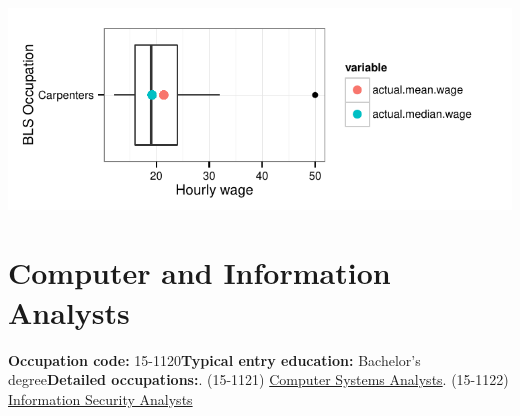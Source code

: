 \documentclass[a4paper,10pt]{article}\usepackage[]{graphicx}\usepackage[]{color}
\makeatletter
\def\maxwidth{ %
  \ifdim\Gin@nat@width>\linewidth
    \linewidth
  \else
    \Gin@nat@width
  \fi
}
\makeatother
\begin{document}
{\centering \includegraphics[width=\maxwidth]{figure/unnamed-chunk-256} 

}


\newpage\section{Computer and Information Analysts}\textbf{Occupation code:} 15-1120\newline\textbf{Typical entry education:} Bachelor's degree\newline\textbf{Detailed occupations:}. (15-1121)  \href{http://www.bls.gov/oes/current/oes151121.htm}{Computer Systems Analysts}. (15-1122)  \href{http://www.bls.gov/oes/current/oes151122.htm}{Information Security Analysts}\newline%
\end{document}

